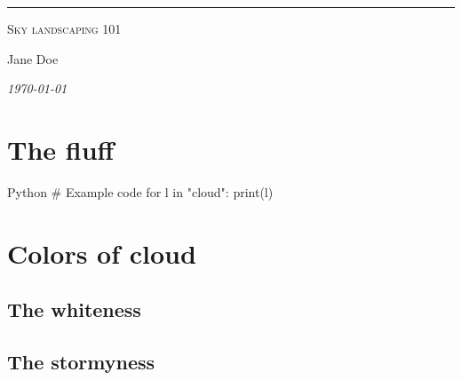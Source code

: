 \documentclass[a4paper, 10pt]{article}
\begin{document}
{\parindent0pt
{\sffamily
    {\color{sky}{\Large ASSIGNMENT 1} 
    \rule[-.2ex]{.25ex}{1.2em}}
    {\color{lavender}{\Large Cloud anatomy}}

    {\color{coal}\footnotesize
        \textsc{\small Sky landscaping 101} \vspace{-.3em}
    
    Jane Doe \vspace{-1.4em}

    \textit{\today} \vspace{4em}}
}}


\section*{The fluff}
\lipsum[4]

\begin{code}{Python}
# Example code
for l in "cloud":
    print(l)
\end{code}

\section*{Colors of cloud}
\lipsum[5][1-5]

\subsection*{The whiteness}
\lipsum[6]

\subsection*{The stormyness}
\lipsum[8]
\end{document}
